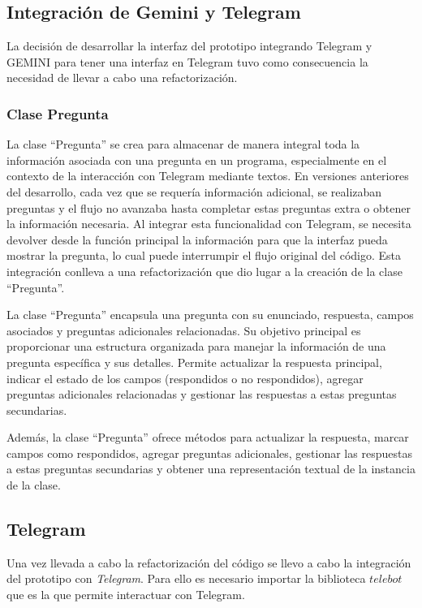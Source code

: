 \subsection{Integración de Gemini y Telegram}
La decisión de desarrollar la interfaz del prototipo integrando Telegram y GEMINI para tener una interfaz en Telegram tuvo como consecuencia la necesidad de llevar a cabo una refactorización.

\subsubsection{Clase Pregunta}
La clase ``Pregunta'' se crea para almacenar de manera integral toda la información asociada con una pregunta en un programa, especialmente en el contexto de la interacción con Telegram mediante textos. En versiones anteriores del desarrollo, cada vez que se requería información adicional, se realizaban preguntas y el flujo no avanzaba hasta completar estas preguntas extra o obtener la información necesaria. Al integrar esta funcionalidad con Telegram, se necesita devolver desde la función principal la información para que la interfaz pueda mostrar la pregunta, lo cual puede interrumpir el flujo original del código. Esta integración conlleva a una refactorización que dio lugar a la creación de la clase ``Pregunta''.

La clase ``Pregunta'' encapsula una pregunta con su enunciado, respuesta, campos asociados y preguntas adicionales relacionadas. Su objetivo principal es proporcionar una estructura organizada para manejar la información de una pregunta específica y sus detalles. Permite actualizar la respuesta principal, indicar el estado de los campos (respondidos o no respondidos), agregar preguntas adicionales relacionadas y gestionar las respuestas a estas preguntas secundarias.

Además, la clase ``Pregunta'' ofrece métodos para actualizar la respuesta, marcar campos como respondidos, agregar preguntas adicionales, gestionar las respuestas a estas preguntas secundarias y obtener una representación textual de la instancia de la clase.

\subsection{Telegram}
\label{sec:Telegram}
Una vez llevada a cabo la refactorización del código se llevo a cabo la integración del prototipo con \textit{Telegram}. Para ello es necesario importar la biblioteca $telebot$ que es la que permite interactuar con Telegram. 

